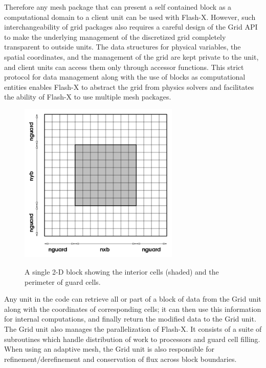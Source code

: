 Therefore any mesh package that can present a self contained block as
a computational domain to a client unit can be used with
Flash-X. However, such interchangeability of grid packages  also
requires a careful design of the \unit{Grid} API to make the
underlying management of the discretized grid completely transparent
to outside units.  The data structures for physical variables, the
spatial coordinates, and the management of the grid are kept private
to the  unit, and client units can access them only through
accessor functions.  This strict protocol for data management along
with the use of blocks as computational entities enables Flash-X to
abstract the grid from physics solvers and facilitates the ability of
Flash-X to use multiple mesh packages.
\begin{figure}
\begin{center}
{\leavevmode\includegraphics[width=3in]{Grid_single_block}}
\end{center}
\caption[A 2-D block with guard cells]{\label{Fig:single_block.eps} A
single 2-D block showing the
interior cells (shaded) and the perimeter of guard cells.}
\end{figure}

Any unit in the code can retrieve all or part of a block of data from
the \unit{Grid} unit along with the coordinates of corresponding
cells; it can then use this information for internal computations, and
finally return the modified data to the \unit{Grid} unit. The
\unit{Grid} unit also manages the parallelization of Flash-X. It
consists of a suite of subroutines which handle distribution of work
to processors and guard cell filling. When using an adaptive mesh, the
Grid unit is also responsible for refinement/derefinement and
conservation of flux across block boundaries. 

